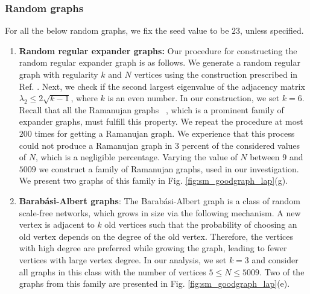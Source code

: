 \documentclass[%
 reprint,
 superscriptaddress,
 amsmath,amssymb,
 aps,
 pra,
floatfix,
nofootinbib,
]{revtex4-2}
\theoremstyle{definition}
\theoremstyle{remark}
\begin{document}
\begin{appendix}
	\subsubsection{Random graphs}
    \label{Random_graphs_Laplacian}
    
	For all the below random graphs, we fix the seed value to be $23$, unless specified.
	\begin{enumerate} 
		\item 
		\textbf{Random regular expander graphs:} Our procedure for constructing the random regular expander graph is as follows. We generate a random regular graph with regularity $k$ and $N$ vertices using the construction prescribed in Ref. \cite{friedman2003proof}. Next, we check if the second largest eigenvalue of the adjacency matrix $\lambda_2 \le 2\sqrt{k-1}$, where $k$ is an even number. In our construction, we set $k=6$. Recall that all the Ramanujan graphs ~\cite{murty2020ramanujan}, which is a prominent family of expander graphs, must fulfill this property. We repeat the procedure at most $200$ times for getting a Ramanujan graph. We experience that this process could not produce a Ramanujan graph in $3$ percent of the considered values of $N$, which is a negligible percentage. Varying the value of $N$ between $9$ and $5009$ we construct a family of Ramanujan graphs, used in our investigation. We present two graphs of this family in Fig. \ref{fig:sm_goodgraph_lap}(g). 
		
		\item 
		\textbf{Barabási-Albert graphs}\cite{barabasi1999emergence}: 
         The Barab\'{a}si-Albert graph is a class of random scale-free networks, which grows in size via the following mechanism. A new vertex is adjacent to $k$ old vertices such that the probability of choosing an old vertex depends on the degree of the old vertex. Therefore, the vertices with high degree are preferred while growing the graph, leading to fewer vertices with large vertex degree. In our analysis, we set $k=3$ and consider all graphs in this class with the number of vertices $5 \leq N \leq 5009$. Two of the graphs from this family are presented in Fig. \ref{fig:sm_goodgraph_lap}(e). 
		 

\end{enumerate}
\end{appendix}
\end{document}
